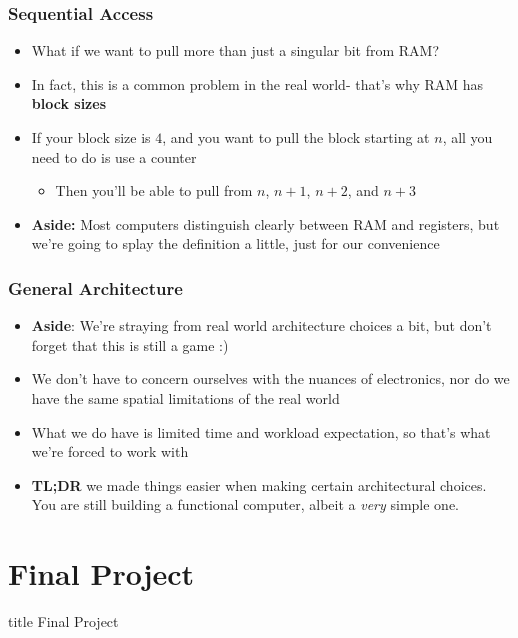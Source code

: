 \documentclass{beamer}
\begin{document}
        \begin{frame}
        		\frametitle{Sequential Access}
        		\begin{itemize}
        			\item What if we want to pull more than just a singular bit from RAM?
        			\item In fact, this is a common problem in the real world- that's why RAM has \textbf{block sizes}
        			\item If your block size is $4$, and you want to pull the block starting at $n$, all you need to do is use a counter
        			\begin{itemize}
        				\item Then you'll be able to pull from $n$, $n+1$, $n+2$, and $n+3$
        			\end{itemize}
        			\item \textbf{Aside:} Most computers distinguish clearly between RAM and registers, but we're going to splay the definition a little, just for our convenience
        		\end{itemize}
        \end{frame}
        
        \begin{frame}
        		\frametitle{General Architecture}
        		\begin{itemize}
        			\item \textbf{Aside}: We're straying from real world architecture choices a bit, but don't forget that this is still a game :)
        			\item We don't have to concern ourselves with the nuances of electronics, nor do we have the same spatial limitations of the real world
        			\item What we do have is limited time and workload expectation, so that's what we're forced to work with
        			\item \textbf{TL;DR} we made things easier when making certain architectural choices. You are still building a functional computer, albeit a \textit{very} simple one.
        		\end{itemize}
        \end{frame}
        
        
    \section{Final Project}
    
    		\begin{frame}
                \vfill
                \centering
                \begin{beamercolorbox}[sep=8pt,center,shadow=true,rounded=true]{title}
                    Final Project\par%
                \end{beamercolorbox}
                \vfill
        \end{frame}
		
\end{document}
